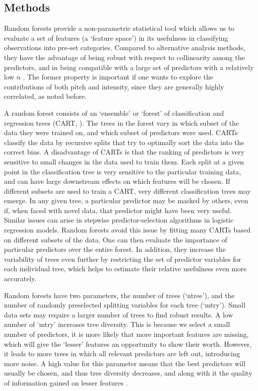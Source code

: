 \documentclass[preprint,review,12pt,authoryear,times]{elsarticle}
\begin{document}
\subsection{Methods}

Random forests provide a non-parametric statistical tool which allows us to evaluate a set of features (a `feature space') in its usefulness in classifying observations into pre-set categories. Compared to alternative analysis methods, they have the advantage of being robust with respect to collinearity among the predictors, and in being compatible with a large set of predictors with a relatively low $n$ \citep{strob09}. The former property is important if one wants to explore the contributions of both pitch and intensity, since they are generally highly correlated, as noted before. 

A random forest consists of an `ensemble' or `forest' of classification and regression trees (CART, \citealt{breim84}). The trees in the forest vary in which subset of the data they were trained on, and which subset of predictors were used. CARTs classify the data by recursive splits that try to optimally sort the data into the correct bins. A disadvantage of CARTs is that the ranking of predictors is very sensitive to small changes in the data used to train them. Each split at a given point  in the classification tree is very sensitive to the particular training data, and can have large downstream effects on which features will be chosen. If different subsets are used to train a CART, very different classification trees may emerge. In any given tree, a particular predictor may be masked by others, even if, when faced with novel data, that predictor might have been very useful. Similar issues can arise in stepwise predictor-selection algorithms in logistic regression models. Random forests avoid this issue by fitting many CARTs based on different subsets of the data.  One can then evaluate the importance of particular predictors over the entire forest. In addition, they increase the variability of trees even further by restricting the set of predictor variables for each individual tree, which helps to estimate their relative usefulness even more accurately. 

Random forests have two parameters, the number of trees (`ntree'), and the number of randomly preselected splitting variables for each tree (`mtry'). Small data sets may require a larger number of trees to find robust results. A low number of `mtry' increases tree diversity. This is because we select a small number of predictors, it is more likely that more  important features are missing, which will give the `lesser' features an opportunity to show their worth. However, it leads to more trees in which all relevant predictors are left out, introducing more noise. A high value for this parameter means that the best predictors will usually be chosen, and thus tree diversity decreases,  and along with it the quality of information gained on lesser features \citep[for more discussion, see][]{strob09}. 
\end{document}
